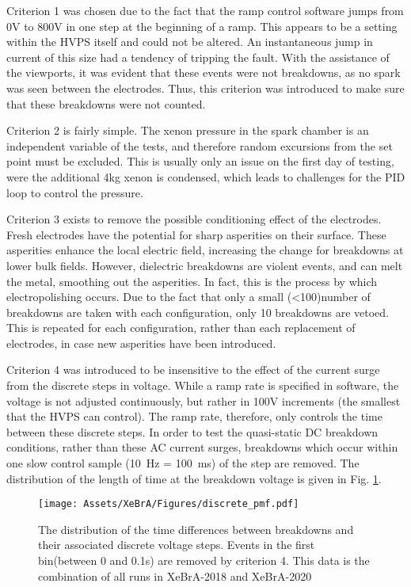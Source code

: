 Criterion 1 was chosen due to the fact that the ramp control software jumps from 0V to 800V in one step at the beginning of a ramp.
This appears to be a setting within the HVPS itself and could not be altered.
An instantaneous jump in current of this size had a tendency of tripping the fault.
With the assistance of the viewports, it was evident that these events were not breakdowns, as no spark was seen between the electrodes.
Thus, this criterion was introduced to make sure that these breakdowns were not counted.

Criterion 2 is fairly simple. 
The xenon pressure in the spark chamber is an independent variable of the tests, and therefore random excursions from the set point must be excluded.
This is usually only an issue on the first day of testing, were the additional 4kg xenon is condensed, which leads to challenges for the PID loop to control the pressure.

Criterion 3  exists to remove the possible conditioning effect of the electrodes.
Fresh electrodes have the potential for sharp asperities on their surface.
These asperities enhance the local electric field, increasing the change for breakdowns at lower bulk fields.
However, dielectric breakdowns are violent events, and can melt the metal, smoothing out the asperities.
In fact, this is the process by which electropolishing\cite{noauthor_electropolishing_nodate} occurs.
Due to the fact that only a small
(<100)number of breakdowns are taken with each configuration, only 10 breakdowns are vetoed.
This is repeated for each configuration, rather than each replacement of electrodes, in case new asperities have been introduced.


Criterion 4 was introduced to be insensitive to the effect of the current surge from the discrete steps in voltage.
While a ramp rate is specified in software, the voltage is not adjusted continuously, but rather in 100V increments (the smallest that the HVPS can control).
The ramp rate, therefore, only controls the time between these discrete steps.
In order to test the quasi-static DC breakdown conditions, rather than these AC current surges, breakdowns which occur within one slow control sample (10~Hz = 100~ms) of the step are removed.
The distribution of the length of time at the breakdown voltage is given in Fig. \ref{fig:discrete_pmf}.

\begin{figure}
    \centering
    \texttt{[image: Assets/XeBrA/Figures/discrete\_pmf.pdf]}
    \caption[The distribution of the time differences between breakdowns and their associated discrete voltage steps. ] %
    {The distribution of the time differences between breakdowns and their associated discrete voltage steps. 
    Events in the first bin(between 0 and 0.1s) are removed by criterion 4.
    This data is the combination of all runs in XeBrA-2018 and XeBrA-2020}
    \label{fig:discrete_pmf}
\end{figure}

